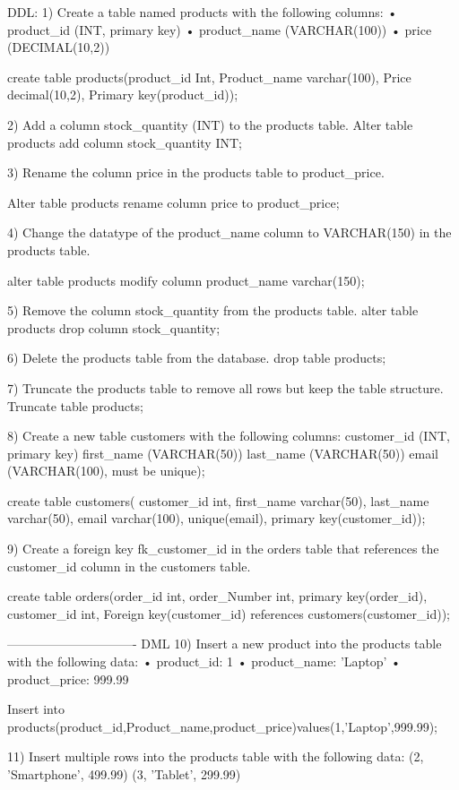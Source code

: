 DDL:
1) Create a table named products with the following columns:
• product_id (INT, primary key)
• product_name (VARCHAR(100))
• price (DECIMAL(10,2))

create table products(product_id Int,
Product_name varchar(100),
Price decimal(10,2),
Primary key(product_id));

2) Add a column stock_quantity (INT) to the products table.
Alter table products
add column stock_quantity INT;

3) Rename the column price in the products table to product_price.

Alter table products
rename column price to product_price;

4) Change the datatype of the product_name column to VARCHAR(150) in the products table.

alter table products
modify column product_name  varchar(150);

5) Remove the column stock_quantity from the products table.
alter table products
drop column stock_quantity;

6) Delete the products table from the database.
drop table products;

7) Truncate the products table to remove all rows but keep the table structure.
Truncate table products;

8) Create a new table customers with the following columns:
customer_id (INT, primary key)
first_name (VARCHAR(50))
last_name (VARCHAR(50))
email (VARCHAR(100), must be unique);

create table customers(
customer_id int,
first_name varchar(50),
last_name varchar(50),
email varchar(100),
unique(email),
primary key(customer_id));

9) Create a foreign key fk_customer_id in the orders table that references the customer_id
column in the customers table.

create table orders(order_id int,
order_Number int,
primary key(order_id),
customer_id int,
Foreign key(customer_id) references customers(customer_id));

-------------------------------
DML
10) Insert a new product into the products table with the following data:
• product_id: 1
• product_name: 'Laptop'
• product_price: 999.99


Insert into products(product_id,Product_name,product_price)values(1,'Laptop',999.99);

11) Insert multiple rows into the products table with the following data:
(2, 'Smartphone', 499.99)
(3, 'Tablet', 299.99)

